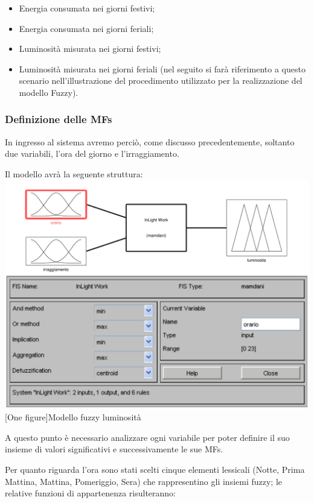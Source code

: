 \begin{itemize}
  \item Energia consumata nei giorni festivi;
  \item Energia consumata nei giorni feriali;
  \item Luminosità misurata nei giorni festivi;
  \item Luminosità misurata nei giorni feriali (nel seguito si farà riferimento a questo scenario nell'illustrazione del procedimento utilizzato per la realizzazione del modello Fuzzy).
\end{itemize}


\subsubsection{Definizione delle MFs}
In ingresso al sistema avremo perciò, come discusso precedentemente, soltanto due variabili, l'ora del giorno e l'irraggiamento.

Il modello avrà la seguente struttura:\\
\vspace{20px}
\includegraphics[scale=0.5]{images/fuzzy/modello_fuzzy_luminosita.pdf}
[One figure]{Modello fuzzy luminosità}
\vspace{20px}

A questo punto è necessario analizzare ogni variabile per poter definire il suo insieme di valori significativi e successivamente le sue MFs.

Per quanto riguarda l'ora sono stati scelti cinque elementi lessicali (Notte, Prima Mattina, Mattina, Pomeriggio, Sera) che rappresentino gli insiemi fuzzy; le relative funzioni di appartenenza risulteranno:\\


